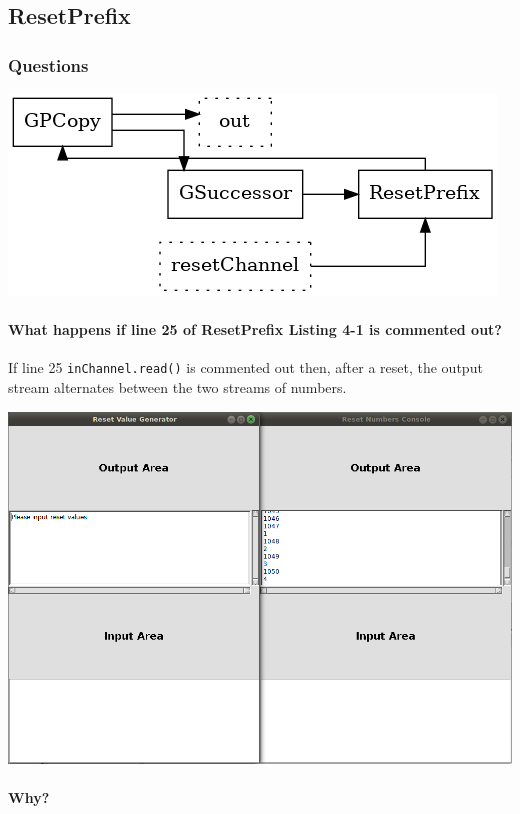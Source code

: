 \subsection{ResetPrefix}

\subsubsection*{Questions}

\includegraphics[width=\textwidth]{graphs/chapter4/4-1-1.png}

\paragraph{What happens if line {25} of ResetPrefix Listing 4-1 is commented out?}

If line 25 \texttt{inChannel.read()} is commented out then, after a reset, the output stream alternates between the two streams of numbers.

\includegraphics[width=\textwidth]{img/screenshots/4-1-1.png}

\paragraph{Why?}


